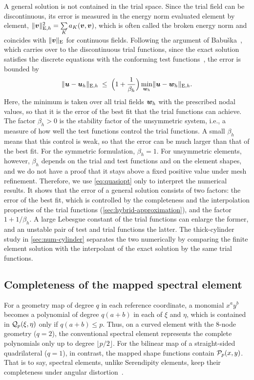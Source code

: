 A general solution is not contained in the trial space. Since the trial field can be discontinuous, its error is measured in the energy norm evaluated element by element, $\lVert \bm{v}\rVert_{\mathrm{E},h}^2=\sum\limits_{K}a_K(\bm{v},\bm{v})$, which is often called the broken energy norm and coincides with $\lVert \bm{v}\rVert_{\mathrm{E}}$ for continuous fields. Following the argument of Babu\v{s}ka~\cite[Theorem~2.2]{Babuska1971Error}, which carries over to the discontinuous trial functions, since the exact solution satisfies the discrete equations with the conforming test functions~\cite{Eisentraeger2026axisymmetric}, the error is bounded by
%
\begin{equation}
  \lVert \bm{u}-\bm{u}_h\rVert_{\mathrm{E},h}\;\le\;\Bigl(1+\frac{1}{\beta_h}\Bigr)\min_{\bm{w}_h}\lVert \bm{u}-\bm{w}_h\rVert_{\mathrm{E},h} .
  \label{eq:quasiopt}
\end{equation}
%
Here, the minimum is taken over all trial fields $\bm{w}_h$ with the prescribed nodal values, so that it is the error of the best fit that the trial functions can achieve. The factor $\beta_h>0$ is the stability factor of the unsymmetric system, i.e., a measure of how well the test functions control the trial functions. A small $\beta_h$ means that this control is weak, so that the error can be much larger than that of the best fit. For the symmetric formulation, $\beta_h=1$. For unsymmetric elements, however, $\beta_h$ depends on the trial and test functions and on the element shapes, and we do not have a proof that it stays above a fixed positive value under mesh refinement. Therefore, we use \cref{eq:quasiopt} only to interpret the numerical results. It shows that the error of a general solution consists of two factors: the error of the best fit, which is controlled by the completeness and the interpolation properties of the trial functions (\cref{sec:hybrid-approximation}), and the factor $1+1/\beta_h$. A large Lebesgue constant of the trial functions can enlarge the former, and an unstable pair of test and trial functions the latter. The thick-cylinder study in \cref{sec:num-cylinder} separates the two numerically by comparing the finite element solution with the interpolant of the exact solution by the same trial functions.
%
\subsection{Completeness of the mapped spectral element}
\label{sec:completeness}
%
For a geometry map of degree $q$ in each reference coordinate, a monomial $x^ay^b$ becomes a polynomial of degree $q(a+b)$ in each of $\xi$ and $\eta$, which is contained in $\mathcal Q_p(\xi,\eta)$ only if $q(a+b)\le p$. Thus, on a curved element with the 8-node geometry ($q=2$), the conventional spectral element represents the complete polynomials only up to degree $\lfloor p/2\rfloor$. For the bilinear map of a straight-sided quadrilateral ($q=1$), in contrast, the mapped shape functions contain $\mathcal P_p(x,y)$. That is to say, spectral elements, unlike Serendipity elements, keep their completeness under angular distortion~\cite{Lee1993effects,Arnold2002Approximation}.


